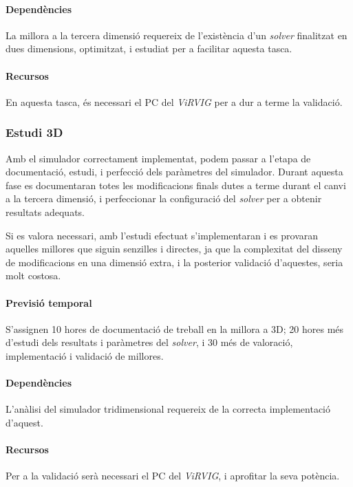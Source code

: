 \documentclass[a4paper]{report}
\begin{document}
	\paragraph{\quad Dependències} La millora a la tercera dimensió requereix de l'existència d'un \textit{solver} finalitzat en dues dimensions, optimitzat, i estudiat per a facilitar aquesta tasca.
	\paragraph{\quad Recursos} En aquesta tasca, és necessari el PC del \textit{ViRVIG} per a dur a terme la validació.
	
	\subsubsection{Estudi 3D}
	Amb el simulador correctament implementat, podem passar a l'etapa de documentació, estudi, i perfecció dels paràmetres del simulador. Durant aquesta fase es documentaran totes les modificacions finals dutes a terme durant el canvi a la tercera dimensió, i perfeccionar la configuració del \textit{solver} per a obtenir resultats adequats. \par
	Si es valora necessari, amb l'estudi efectuat s'implementaran i es provaran aquelles millores que siguin senzilles i directes, ja que la complexitat del disseny de modificacions en una dimensió extra, i la posterior validació d'aquestes, seria molt costosa.
	\paragraph{\quad Previsió temporal} S'assignen 10 hores de documentació de treball en la millora a 3D; 20 hores més d'estudi dels resultats i paràmetres del \textit{solver}, i 30 més de valoració, implementació i validació de millores.
	\paragraph{\quad Dependències} L'anàlisi del simulador tridimensional requereix de la correcta implementació d'aquest.
	\paragraph{\quad Recursos} Per a la validació serà necessari el PC del \textit{ViRVIG}, i aprofitar la seva potència.
	
\end{document}
